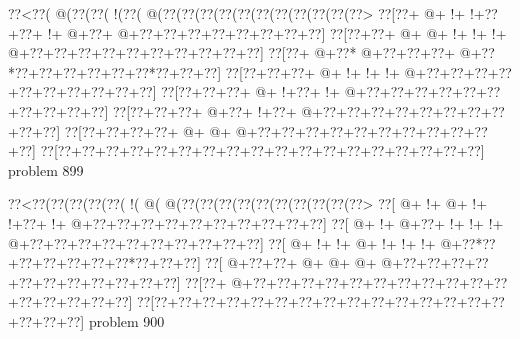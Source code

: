 \vbox{\vbox{\goo
\0??<\0??(\- @(\0??(\0??(\- !(\0??(\- @(\0??(\0??(\0??(\0??(\0??(\0??(\0??(\0??(\0??(\0??(\0??>
\0??[\0??+\- @+\- !+\- !+\0??+\0??+\- !+\- @+\0??+\- @+\0??+\0??+\0??+\0??+\0??+\0??+\0??+\0??]
\0??[\0??+\0??+\- @+\- @+\- !+\- !+\- !+\- @+\0??+\0??+\0??+\0??+\0??+\0??+\0??+\0??+\0??+\0??]
\0??[\0??+\- @+\0??*\- @+\0??+\0??+\0??+\- @+\0??*\0??+\0??+\0??+\0??+\0??+\0??*\0??+\0??+\0??]
\0??[\0??+\0??+\0??+\- @+\- !+\- !+\- !+\- @+\0??+\0??+\0??+\0??+\0??+\0??+\0??+\0??+\0??+\0??]
\0??[\0??+\0??+\0??+\- @+\- !+\0??+\- !+\- @+\0??+\0??+\0??+\0??+\0??+\0??+\0??+\0??+\0??+\0??]
\0??[\0??+\0??+\0??+\- @+\0??+\- !+\0??+\- @+\0??+\0??+\0??+\0??+\0??+\0??+\0??+\0??+\0??+\0??]
\0??[\0??+\0??+\0??+\0??+\- @+\- @+\- @+\0??+\0??+\0??+\0??+\0??+\0??+\0??+\0??+\0??+\0??+\0??]
\0??[\0??+\0??+\0??+\0??+\0??+\0??+\0??+\0??+\0??+\0??+\0??+\0??+\0??+\0??+\0??+\0??+\0??+\0??]
}
\hfil problem 899\hfil\break
}



\vbox{\vbox{\goo
\0??<\0??(\0??(\0??(\0??(\0??(\- !(\- @(\- @(\0??(\0??(\0??(\0??(\0??(\0??(\0??(\0??(\0??(\0??>
\0??[\- @+\- !+\- @+\- !+\- !+\0??+\- !+\- @+\0??+\0??+\0??+\0??+\0??+\0??+\0??+\0??+\0??+\0??]
\0??[\- @+\- !+\- @+\0??+\- !+\- !+\- !+\- @+\0??+\0??+\0??+\0??+\0??+\0??+\0??+\0??+\0??+\0??]
\0??[\- @+\- !+\- !+\- @+\- !+\- !+\- !+\- @+\0??*\0??+\0??+\0??+\0??+\0??+\0??*\0??+\0??+\0??]
\0??[\- @+\0??+\0??+\- @+\- @+\- @+\- @+\0??+\0??+\0??+\0??+\0??+\0??+\0??+\0??+\0??+\0??+\0??]
\0??[\0??+\- @+\0??+\0??+\0??+\0??+\0??+\0??+\0??+\0??+\0??+\0??+\0??+\0??+\0??+\0??+\0??+\0??]
\0??[\0??+\0??+\0??+\0??+\0??+\0??+\0??+\0??+\0??+\0??+\0??+\0??+\0??+\0??+\0??+\0??+\0??+\0??]
}
\hfil problem 900\hfil\break
}
